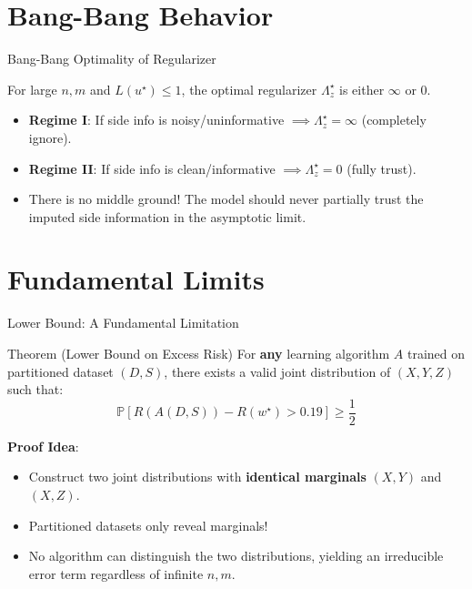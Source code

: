 \documentclass[aspectratio=169,xcolor={dvipsnames,table}]{beamer}
\newcommand{\ws}{w^\star}
\newcommand{\us}{u^\star}
\begin{document}
\section{Bang-Bang Behavior}
\begin{frame}{Bang-Bang Optimality of Regularizer}
    \begin{tcolorbox}[colback=CyanPrimary!5,colframe=CyanPrimary,title=\textbf{Key Takeaway}]
        For large $n, m$ and $L(\us) \leq 1$, the optimal regularizer $\Lambda_z^\star$ is either \textbf{$\infty$} or \textbf{$0$}.
    \end{tcolorbox}
    
    \begin{itemize}
        \item \textbf{Regime I}: If side info is noisy/uninformative $\implies \Lambda_z^\star = \infty$ (completely ignore).
        \item \textbf{Regime II}: If side info is clean/informative $\implies \Lambda_z^\star = 0$ (fully trust).
        \item \alert{There is no middle ground!} The model should never partially trust the imputed side information in the asymptotic limit.
    \end{itemize}
\end{frame}

\section{Fundamental Limits}
\begin{frame}{Lower Bound: A Fundamental Limitation}
    \begin{block}{Theorem (Lower Bound on Excess Risk)}
        For \textbf{any} learning algorithm $A$ trained on partitioned dataset $(D, S)$, there exists a valid joint distribution of $(X,Y,Z)$ such that:
        \[ \mathbb{P}\left[ R(A(D,S)) - R(\ws) > 0.19 \right] \geq \frac{1}{2} \]
    \end{block}
    
    \vspace{0.3cm}
    \textbf{Proof Idea}:
    \begin{itemize}
        \item Construct two joint distributions with \textbf{identical marginals} $(X,Y)$ and $(X,Z)$.
        \item Partitioned datasets only reveal marginals!
        \item No algorithm can distinguish the two distributions, yielding an irreducible error term regardless of infinite $n, m$.
    \end{itemize}
\end{frame}
\end{document}
